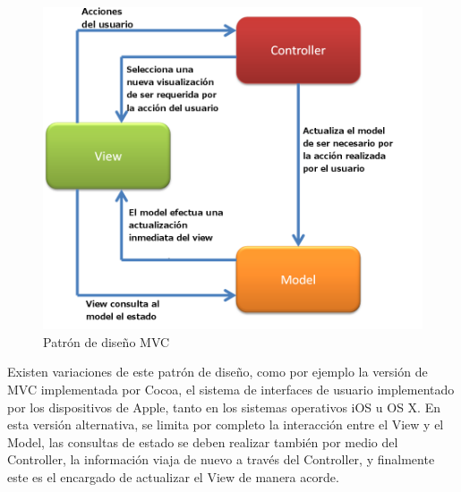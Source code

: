 \begin{figure}
	\includegraphics[width=1\linewidth]{images/mvcbase}
	\caption{Patrón de diseño MVC} \label{fig:mvc}
\end{figure}


Existen variaciones de este patrón de diseño, como por ejemplo la versión de MVC implementada por Cocoa, el sistema de interfaces de usuario implementado por los dispositivos de Apple, tanto en los sistemas operativos iOS u OS X. En esta versión alternativa, se limita por completo la interacción entre el View  y el Model, las consultas de estado se deben realizar también por medio del Controller, la información viaja de nuevo a través del Controller, y finalmente este es el encargado de actualizar el View de manera acorde.
